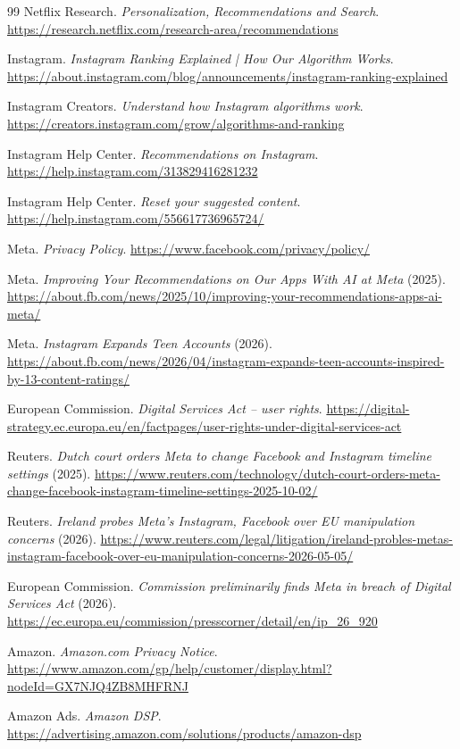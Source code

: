 \documentclass[12pt, a4paper]{article}
\begin{document}
\begin{thebibliography}{99}
Netflix Research. \textit{Personalization, Recommendations and Search}. \url{https://research.netflix.com/research-area/recommendations}

Instagram. \textit{Instagram Ranking Explained | How Our Algorithm Works}. \url{https://about.instagram.com/blog/announcements/instagram-ranking-explained}

Instagram Creators. \textit{Understand how Instagram algorithms work}. \url{https://creators.instagram.com/grow/algorithms-and-ranking}

Instagram Help Center. \textit{Recommendations on Instagram}. \url{https://help.instagram.com/313829416281232}

Instagram Help Center. \textit{Reset your suggested content}. \url{https://help.instagram.com/556617736965724/}

Meta. \textit{Privacy Policy}. \url{https://www.facebook.com/privacy/policy/}

Meta. \textit{Improving Your Recommendations on Our Apps With AI at Meta} (2025). \url{https://about.fb.com/news/2025/10/improving-your-recommendations-apps-ai-meta/}

Meta. \textit{Instagram Expands Teen Accounts} (2026). \url{https://about.fb.com/news/2026/04/instagram-expands-teen-accounts-inspired-by-13-content-ratings/}

European Commission. \textit{Digital Services Act -- user rights}. \url{https://digital-strategy.ec.europa.eu/en/factpages/user-rights-under-digital-services-act}

Reuters. \textit{Dutch court orders Meta to change Facebook and Instagram timeline settings} (2025). \url{https://www.reuters.com/technology/dutch-court-orders-meta-change-facebook-instagram-timeline-settings-2025-10-02/}

Reuters. \textit{Ireland probes Meta's Instagram, Facebook over EU manipulation concerns} (2026). \url{https://www.reuters.com/legal/litigation/ireland-probles-metas-instagram-facebook-over-eu-manipulation-concerns-2026-05-05/}

European Commission. \textit{Commission preliminarily finds Meta in breach of Digital Services Act} (2026). \url{https://ec.europa.eu/commission/presscorner/detail/en/ip_26_920}

Amazon. \textit{Amazon.com Privacy Notice}. \url{https://www.amazon.com/gp/help/customer/display.html?nodeId=GX7NJQ4ZB8MHFRNJ}

Amazon Ads. \textit{Amazon DSP}. \url{https://advertising.amazon.com/solutions/products/amazon-dsp}

\end{thebibliography}
\end{document}

